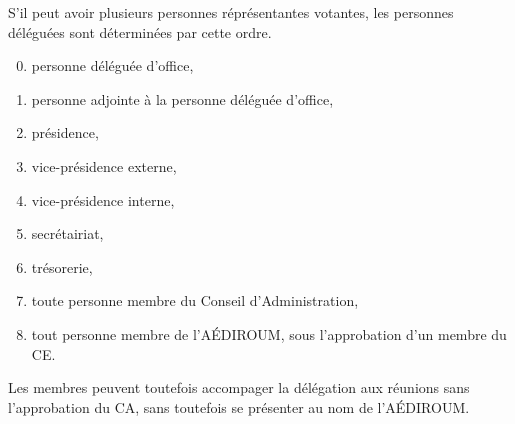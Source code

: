 \documentclass{aediroum}
\begin{document}
S'il peut avoir plusieurs personnes réprésentantes votantes, les personnes déléguées sont déterminées par cette ordre.

\begin{enumerate}\setcounter{enumi}{-1}
\item personne déléguée d'office,
\item personne adjointe à la personne déléguée d'office,
\item présidence,
\item vice-présidence externe,
\item vice-présidence interne,
\item secrétairiat,
\item trésorerie,
\item toute personne membre du Conseil d'Administration,
\item tout personne membre de l'AÉDIROUM, sous l'approbation d'un membre du CE.
\end{enumerate}

Les membres peuvent toutefois accompager la délégation aux réunions sans l'approbation du CA, sans toutefois se présenter au nom de l'AÉDIROUM.
\end{document}

